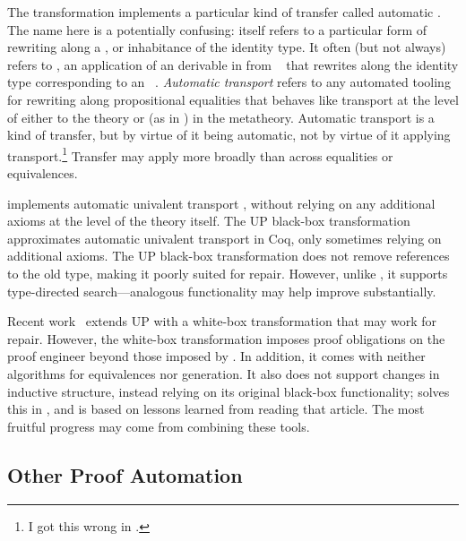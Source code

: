 The \toolnamec transformation implements a particular kind of transfer called automatic .
The name here is a potentially confusing:  itself refers to a particular form of 
rewriting along a , or inhabitance of the identity type.
It often (but not always) refers to  , an application of an  derivable
in  from ~\cite{univalent2013homotopy}
that rewrites along the identity type corresponding to an ~\cite{escardo2018self}.
\textit{Automatic transport} refers to any automated tooling for rewriting along propositional equalities
that behaves like transport at the level of either  to the theory or (as in \toolnamec)  in the metatheory.
Automatic transport is a kind of transfer, but by virtue of it being automatic, not by virtue of it applying transport.\footnote{I got this wrong in .}
Transfer may apply more broadly than across equalities or equivalences.

\toolnamec implements automatic univalent transport , without relying on any additional axioms at the level of the theory itself.
The UP black-box transformation~\cite{tabareau2017equivalences} approximates automatic univalent transport 
in Coq, only sometimes relying on additional axioms.
The UP black-box transformation does not remove references to the old type, making it poorly suited for repair.
However, unlike \toolnamec, it supports type-directed search---analogous functionality
may help improve \toolnamec substantially.

Recent work~\cite{tabareau2019marriage} extends UP with 
a white-box transformation that may work for repair.
However, the white-box transformation imposes proof obligations on the proof engineer beyond those imposed by \toolnamec.
In addition, it comes with neither  algorithms for equivalences nor  generation.
It also does not support changes in inductive structure,
instead relying on its original black-box functionality;
 solves this in \toolnamec, and is based on lessons learned from reading that article.
The most fruitful progress may come from combining these tools. %

\subsection{Other Proof Automation}
\label{sec:automation}

